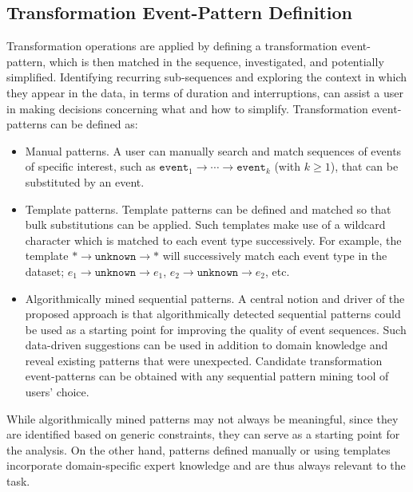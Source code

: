 \documentclass[camera]{vgtc}                          %
\begin{document}
\subsection{Transformation Event-Pattern Definition}
\label{sec:ptrn-def}
Transformation operations are applied by defining a transformation event-pattern, which is then matched in the sequence, investigated, and potentially simplified. Identifying recurring sub-sequences and exploring the context in which they appear in the data, in terms of duration and interruptions, can assist a user in making decisions concerning what and how to simplify.
Transformation event-patterns can be defined as:
\begin{itemize}
    \itemsep0em
    \vspace{-4pt}
    \item Manual patterns. A user can manually search and match sequences of events of specific interest, such as  $\texttt{event}_1\rightarrow \cdots \rightarrow \texttt{event}_k$ (with $k\geq 1$), that can be substituted by an event.
    
    \vspace{-4pt}
    \item Template patterns. Template patterns can be defined and matched so that bulk substitutions can be applied. Such templates make use of a wildcard character which is matched to each event type successively. For example, the template $ * \rightarrow \texttt{unknown} \rightarrow * $ will successively match each event type in the dataset; $ e_1 \rightarrow \texttt{unknown} \rightarrow e_1 $, $ e_2 \rightarrow \texttt{unknown} \rightarrow e_2 $, etc.  
    
    \vspace{-4pt}
    \item Algorithmically mined sequential patterns. A central notion and driver of the proposed approach is that algorithmically detected sequential patterns could be used as a starting point for improving the quality of event sequences. Such data-driven suggestions can be used in addition to domain knowledge and reveal existing patterns that were unexpected.
    Candidate transformation event-patterns can be obtained with any sequential pattern mining tool of users' choice. 
\end{itemize}
While algorithmically mined patterns may not always be meaningful, since they are identified based on generic constraints, they can serve as a starting point for the analysis. On the other hand, patterns defined manually or using templates incorporate domain-specific expert knowledge and are thus always relevant to the task.
\end{document}
